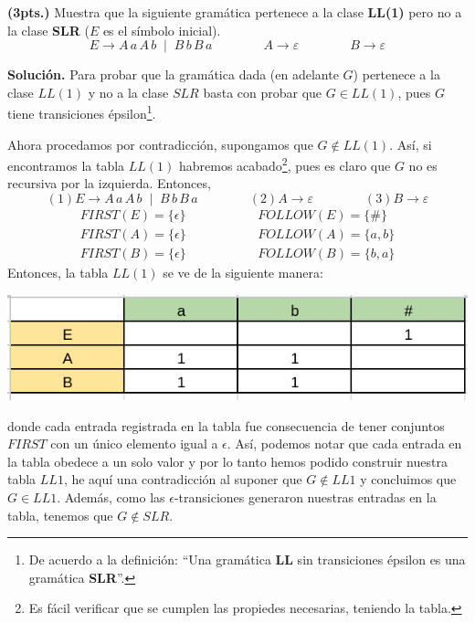 \textbf{(3pts.)} Muestra que la siguiente gram\'atica pertenece a la 
clase \textbf{LL(1)} pero no a la clase \textbf{SLR} ($E$ es el s\'imbolo inicial).
\[
E \to A \, a\, A\,b \;\mid\; B\,b\,B\,a \qquad \qquad  A \to \varepsilon 
\qquad\qquad B\to \varepsilon
\]

\textbf{Solución.} Para probar que la gramática dada (en adelante $G$) pertenece
a la clase $LL(1)$ y no a la clase $SLR$ basta con probar que $G \in LL(1)$, pues
$G$ tiene transiciones épsilon\footnote{De acuerdo a la definición: ``Una gramática
\textbf{LL} sin transiciones épsilon es una gramática \textbf{SLR}''.}. \newline

Ahora procedamos por contradicción, supongamos que $G \notin LL(1)$. Así, si encontramos
la tabla $LL(1)$ habremos acabado\footnote{Es fácil verificar que se cumplen las propiedes necesarias,
teniendo la tabla.}, pues es claro que $G$ no es recursiva por la izquierda.
Entonces,
\[
(1) E \to A \, a\, A\,b \;\mid\; B\,b\,B\,a \qquad \qquad  (2) A \to \varepsilon 
\qquad\qquad (3) B\to \varepsilon
\]
\begin{eqnarray*}
FIRST(E) = \{\epsilon\} &\qquad \qquad& FOLLOW(E) = \{\#\}\\
FIRST(A) = \{\epsilon\} &\qquad \qquad& FOLLOW(A) = \{a, b\}\\
FIRST(B) = \{\epsilon\} &\qquad \qquad& FOLLOW(B) = \{b, a\}
\end{eqnarray*}
Entonces, la tabla $LL(1)$ se ve de la siguiente manera:
\begin{center}
        \includegraphics[scale=0.40]{./LL1.png}\\[0.4cm]
\end{center}
donde cada entrada registrada en la tabla fue consecuencia de tener
conjuntos $FIRST$ con un único elemento igual a $\epsilon$. Así, podemos
notar que cada entrada en la tabla obedece a un solo valor y por lo
tanto hemos podido construir nuestra tabla $LL1$, he aquí una contradicción
al suponer que $G \notin LL1$ y concluimos que $G \in LL1$. Además, como
las $\epsilon$-transiciones generaron nuestras entradas en la tabla, tenemos
que $G \notin SLR$.

